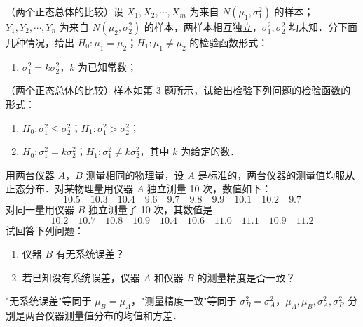 \begin{homework}[3]
（两个正态总体的比较）设 $X_1, X_2, \cdots, X_m$ 为来自 $N(\mu_1, \sigma_1^2)$ 的样本；$Y_1, Y_2, \cdots, Y_n$ 为来自 $N(\mu_2, \sigma_2^2)$ 的样本，两样本相互独立，$\sigma_1^2, \sigma_2^2$ 均未知．分下面几种情况，给出 $H_0: \mu_1 = \mu_2$；$H_1: \mu_1 \neq \mu_2$ 的检验函数形式：

\begin{enumerate}
   

    \item[(2)] $\sigma_1^2 = k\sigma_2^2$，$k$ 为已知常数；

   
\end{enumerate}
\end{homework}

\begin{homework}[4]
（两个正态总体的比较）样本如第 3 题所示，试给出检验下列问题的检验函数的形式：

\begin{enumerate}
    \item[(1)] $H_0: \sigma_1^2 \leqslant \sigma_2^2$；$H_1: \sigma_1^2 > \sigma_2^2$；

    \item[(2)] $H_0: \sigma_1^2 = k\sigma_2^2$；$H_1: \sigma_1^2 \neq k\sigma_2^2$，其中 $k$ 为给定的数．
\end{enumerate}
\end{homework}

\begin{homework}[6]
用两台仪器 $A$，$B$ 测量相同的物理量，设 $A$ 是标准的，两台仪器的测量值均服从正态分布．对某物理量用仪器 $A$ 独立测量 10 次，数值如下：
\[
10.5 \quad 10.3 \quad 10.4 \quad 9.6 \quad 9.7 \quad 9.8 \quad 9.9 \quad 10.1 \quad 10.2 \quad 9.7
\]
对同一量用仪器 $B$ 独立测量了 10 次，其数值是
\[
10.2 \quad 10.7 \quad 10.8 \quad 10.9 \quad 10.4 \quad 10.6 \quad 11.0 \quad 11.1 \quad 10.9 \quad 11.2
\]
试回答下列问题：

\begin{enumerate}
    \item[(1)] 仪器 $B$ 有无系统误差？

    \item[(2)] 若已知没有系统误差，仪器 $A$ 和仪器 $B$ 的测量精度是否一致？
\end{enumerate}

\begin{note}
"无系统误差"等同于 $\mu_B = \mu_A$，"测量精度一致"等同于 $\sigma_B^2 = \sigma_A^2$，$\mu_A, \mu_B, \sigma_A^2, \sigma_B^2$ 分别是两台仪器测量值分布的均值和方差．
\end{note}
\end{homework}
